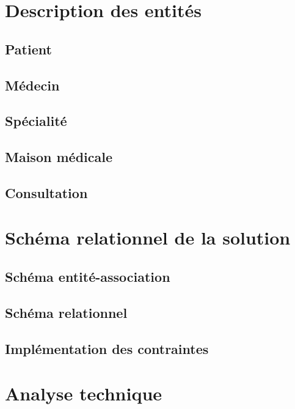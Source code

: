 \documentclass[a4paper,11pt]{article}
\begin{document}
	\newpage
	
	\section{Description des entités}
	
	\subsection{Patient}
	
	\subsection{Médecin}
	
	\subsection{Spécialité}
	
	\subsection{Maison médicale}
	
	\subsection{Consultation}
	
	\newpage
	
	\section{Schéma relationnel de la solution}
	
	\subsection{Schéma entité-association}
	
	\subsection{Schéma relationnel}
	
	\subsection{Implémentation des contraintes}
	
	\newpage
	
	\section{Analyse technique}
	
\end{document}
